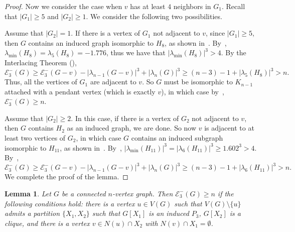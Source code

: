 \documentclass[a4paper,12pt]{article}
\theoremstyle{plain}
\newtheorem{lemma}[thm]{Lemma}
\begin{document}
\begin{proof}
Now we consider the case when $v$ has at least $4$ neighbors in $G_1$. Recall that $|G_1|\geq 5$ and $|G_2|\geq 1$. We consider the following two possibilities.

Assume that $|G_2|=1$. If there is a vertex of $G_1$ not adjacent to $v$, since $|G_1|\geq 5$, then $G$ contains an induced graph isomorphic to $H_8$, as shown in~. By~, $\lambda_{\mathrm{min}}(H_8)=\lambda_{5}(H_8)=-1.776$, thus we have that $|\lambda_{\mathrm{min}}(H_8)|^{3}> 4$. By the Interlacing Theorem (),
$$\mathcal{E}_{3}^{-}(G) \geq\mathcal{E}_{3}^{-}(G-v)-|\lambda_{n-1}(G-v)|^{3}+ |\lambda_{n}(G)|^{3}\geq(n-3)-1+|\lambda_{5}(H_8)|^{3}>n.$$
Thus, all the vertices of $G_1$ are adjacent to $v$. So $G$ must be isomorphic to $K_{n-1}$ attached with a pendant vertex (which is exactly $v$), in which case by~, $\mathcal{E}_{3}^{-}(G) \geq n$.

Assume that $|G_2|\geq 2$. In this case, if there is a vertex of $G_2$ not adjacent to $v$, then $G$ contains $H_2$ as an induced graph, we are done. So now $v$ is adjacent to at least two vertices of $G_2$, in which case $G$ contains an induced subgraph isomorphic to $H_{11}$, as shown in~. By~, $|\lambda_{\mathrm{min}}(H_{11})|^{3}=|\lambda_{6}(H_{11})|^{3}\geq 1.602^3 >4$. By~, 
$$\mathcal{E}_{3}^{-}(G) \geq\mathcal{E}_{3}^{-}(G-v)-|\lambda_{n-1}(G-v)|^{3}+ |\lambda_{n}(G)|^{3}\geq (n-3)-1+|\lambda_{6}(H_{11})|^{3}>n.$$
We complete the proof of the lemma.
\end{proof}


\begin{lemma}\label{lem:oneP3+onecliques}
Let $G$ be a connected $n$-vertex graph. Then $\mathcal{E}_3^{-}(G) \geq n$ if the following conditions hold: there is a vertex $u\in V(G)$ such that $V(G)\setminus \{u\}$ admits a partition $\{X_1, X_2\}$ such that $G[X_1]$ is an induced $P_3$, $G[X_2]$ is a clique, and there is a vertex $v\in N(u)\cap X_2$ with $N(v)\cap X_1=\emptyset$.  
\end{lemma}
\end{document}
